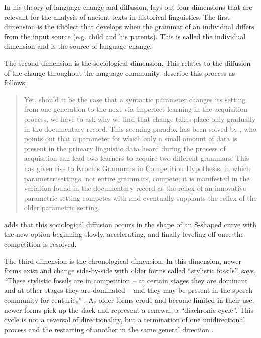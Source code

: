 \documentclass[output=paper,colorlinks,citecolor=brown,draft,draftmode]{langscibook}
\begin{document}
In his theory of language change and diffusion, \citet{Naude2012} lays out four dimensions that are relevant for the analysis of ancient texts in historical linguistics. The first dimension is the idiolect that develops when the grammar of an individual differs from the input source (e.g. child and his parents). This is called the individual dimension and is the source of language change. 

The second dimension is the sociological dimension. This relates to the diffusion of the change throughout the language community. \citet[214]{RingeEska2013} describe this process as follows:
%
\begin{quote}
Yet, should it be the case that a syntactic parameter changes its setting
from one generation to the next via imperfect learning in the acquisition
process, we have to ask why we find that change takes place only gradually
in the documentary record. This seeming paradox has been solved by \citet{Kroch1989}, who points out that a parameter for which only a small amount of data
is present in the primary linguistic data heard during the process of
acquisition can lead two learners to acquire two different grammars. This
has given rise to Kroch's Grammars in Competition Hypothesis, in which parameter settings, not entire grammars, compete; it is manifested in the variation found in the documentary record as the reflex of an innovative parametric setting competes with and eventually supplants the reflex of the older parametric setting.
\end{quote}
%
\citeauthor{Naude2012} adds that this sociological diffusion occurs in the shape of an S-shaped curve with the new option beginning slowly, accelerating, and finally leveling off once the competition is resolved.

The third dimension is the chronological dimension. In this dimension,
newer forms exist and change side-by-side with older forms called
``stylistic fossils''. \citeauthor{Naude2012} says, ``These stylistic
fossils are in competition -- at certain stages they are dominant and at
other stages they are dominated -- and they may be present in the speech
community for centuries'' \parencite[73]{Naude2012}. As older forms erode
and become limited in their use, newer forms pick up the slack and
represent a renewal, a ``diachronic cycle''. This cycle is not a reversal
of directionality, but a termination of one unidirectional process and the
restarting of another in the same general direction \parencite[73]{Naude2012}.  
\end{document}
